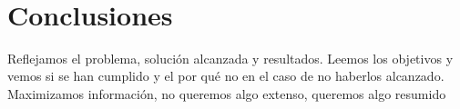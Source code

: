 \newpage
~
\newpage
\section{Conclusiones}
Reflejamos el problema, solución alcanzada y resultados.
Leemos los objetivos y vemos si se han cumplido y el por qué no en el caso de no haberlos alcanzado. 
Maximizamos información, no queremos algo extenso, queremos algo resumido
